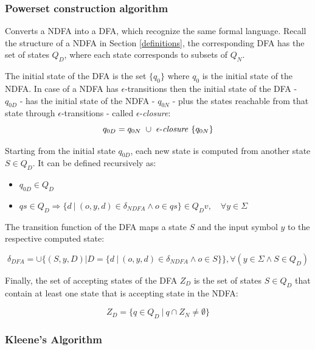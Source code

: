 \subsubsection{Powerset construction algorithm}
Converts a NDFA into a DFA, which recognize the same formal language. Recall the structure of a NDFA in Section \ref{definitions}, the corresponding DFA has the set of states $Q_D$, where each state corresponds to subsets of $Q_N$. 

The initial state of the DFA is the set $\{q_0\}$ where $q_0$ is the initial state of the NDFA. In case of a NDFA has $\epsilon$-transitions then the initial state of the DFA - $q_{0D}$ - has the initial state of the NDFA - $q_{0N}$ - plus the states reachable from that state through $\epsilon$-transitions - called $\epsilon$-\textit{closure}:
\begin{equation*}
    q_{0D} = q_{0N}\ \cup \ \epsilon\text{-\textit{closure}} \ \{q_{0N}\}
\end{equation*}

Starting from the initial state $q_{0D}$, each new state is computed from another state $S \in Q_D$. It can be defined recursively as:
\begin{itemize}
    \item $q_{0D} \in Q_D$
    \item $qs \in Q_D \Rightarrow \{ d\ |\ (o,y,d) \in \delta_{NDFA} \wedge o \in qs\} \in Q_Dv , \quad \forall y \in \Sigma$
\end{itemize}

The transition function of the DFA maps a state $S$ and the input symbol $y$ to the respective computed state:

\begin{equation*}
    \delta_{DFA} = \cup \{(S,y,D) | D = \{ d\ |\ (o,y,d) \in \delta_{NDFA} \wedge o \in S\}\}, \forall{(y \in \Sigma \wedge S \in Q_D)}
\end{equation*}

Finally, the set of accepting states of the DFA $Z_D$ is the set of states $S \in Q_D$ that contain at least one state that is accepting state in the NDFA:

\begin{equation*}
    Z_D = \{q \in Q_D\ |\ q \cap Z_N \neq \emptyset\}
\end{equation*}

\subsubsection{Kleene's Algorithm}

